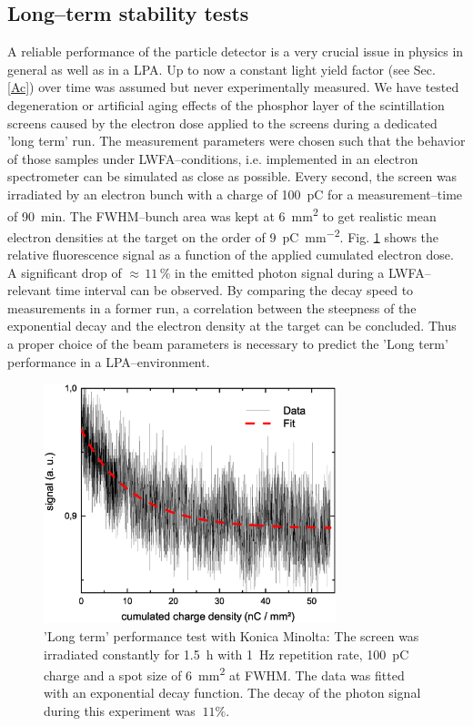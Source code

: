 \documentclass[%
reprint,
amsmath,
amssymb,
aip,
rsi, 
numerical,
floatfix,
]{revtex4-1}
\begin{document}
\subsection{\label{Ls}Long--term stability tests}
A reliable performance of the particle detector is a very crucial issue in physics in general as well as in a LPA.
Up to now a constant light yield factor (see Sec. \ref{Ac}) over time was assumed but never experimentally measured. 
We have tested degeneration or artificial aging effects of the phosphor layer of the scintillation screens caused by the electron dose applied to the screens during a dedicated 'long term' run.
The measurement parameters were chosen such that the behavior of those samples under LWFA--conditions, i.e. implemented in an electron spectrometer can be simulated as close as possible.
Every second, the screen was irradiated by an electron bunch with a charge of \SI{100}{\pico\coulomb} for a measurement--time of \SI{90}{\minute}.
The FWHM--bunch area was kept at \SI{6}{\square\milli\meter} to get realistic mean electron densities at the target on the order of \SI[per-mode=symbol]{9}{\pico\coulomb \per \square\milli\meter}. 
Fig. \ref{fig:Dt_Min_rel} shows the relative fluorescence signal as a function of the applied cumulated electron dose. 
A significant drop of $\approx\, 11\,\%$ in the emitted photon signal during a LWFA--relevant time interval can be observed.
By comparing the decay speed to measurements in a former run, a correlation between the steepness of the exponential decay and the electron density at the target can be concluded.
Thus a proper choice of the beam parameters is necessary to predict the 'Long term' performance in a LPA--environment.
 
\begin{figure}
\includegraphics[width=8.5cm]{./Figures/Dt_Min_rel}%
\caption{\label{fig:Dt_Min_rel} 'Long term' performance test with Konica Minolta: 
The screen was irradiated constantly for \SI{1.5}{\hour} with \SI{1}{\hertz} repetition rate, \SI{100}{\pico\coulomb} charge and a spot size of \SI{6}{\square\milli\meter} at FWHM. 
The data was fitted with an exponential decay function. 
The decay of the photon signal during this experiment was $~11\%$.}
\end{figure}
\end{document}
